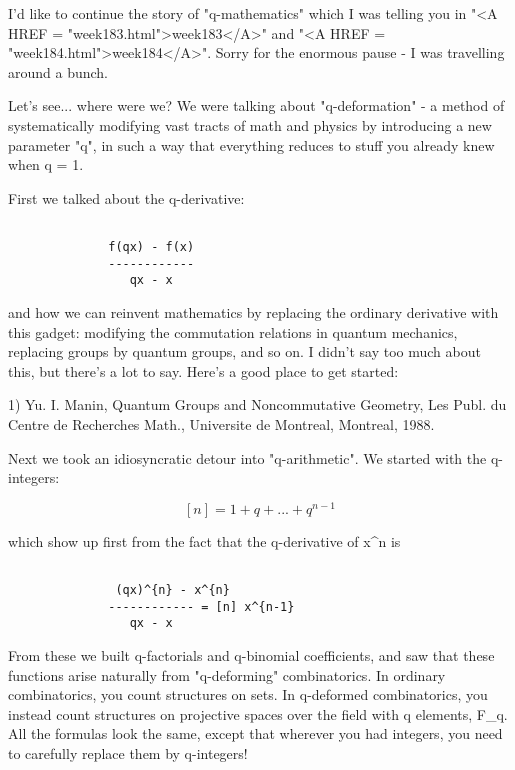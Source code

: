 




I'd like to continue the story of "q-mathematics" which I was
telling you in "<A HREF = "week183.html">week183</A>" and
"<A HREF = "week184.html">week184</A>".  Sorry for the
enormous pause - I was travelling around a bunch.

Let's see... where were we?  We were talking about "q-deformation" - 
a method of systematically modifying vast tracts of math and physics by
introducing a new parameter "q", in such a way that everything reduces
to stuff you already knew when q = 1.

First we talked about the q-derivative:


\begin{verbatim}

              f(qx) - f(x)
              ------------
                 qx - x
\end{verbatim}
    
and how we can reinvent mathematics by replacing the ordinary
derivative with this gadget: modifying the commutation relations in
quantum mechanics, replacing groups by quantum groups, and so on.  
I didn't say too much about this, but there's a lot to say.  Here's a
good place to get started:

1) Yu. I. Manin, Quantum Groups and Noncommutative Geometry, Les
Publ. du Centre de Recherches Math., Universite de Montreal, Montreal,
1988.

Next we took an idiosyncratic detour into "q-arithmetic".  We
started with the q-integers:


$$

[n] = 1 + q + ... + q^{n-1}
$$
    
which show up first from the fact that the q-derivative of x^{n} is 


\begin{verbatim}

               (qx)^{n} - x^{n}
              ------------ = [n] x^{n-1}
                 qx - x
\end{verbatim}
    
From these we built q-factorials and q-binomial coefficients, and saw
that these functions arise naturally from "q-deforming"
combinatorics.  In ordinary combinatorics, you count structures on sets.
In q-deformed combinatorics, you instead count structures on projective
spaces over the field with q elements, F_{q}.  All the formulas look the
same, except that wherever you had integers, you need to carefully
replace them by q-integers!

